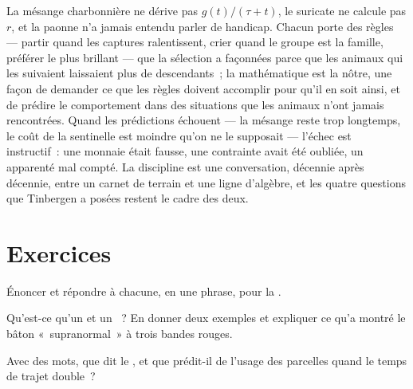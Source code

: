 \begin{remark}\label{rem:b3:behavioural-ecology:remark}
La mésange charbonnière ne dérive pas $g(t)/(\tau + t)$, le suricate ne
calcule pas $r$, et la paonne n'a jamais entendu parler de handicap.
Chacun porte des règles --- partir quand les captures ralentissent,
crier quand le groupe est la famille, préférer le plus brillant --- que
la sélection a façonnées parce que les animaux qui les suivaient
laissaient plus de descendants~; la mathématique est la nôtre, une façon
de demander ce que les règles doivent accomplir pour qu'il en soit
ainsi, et de prédire le comportement dans des situations que les animaux
n'ont jamais rencontrées. Quand les prédictions échouent --- la mésange
reste trop longtemps, le coût de la sentinelle est moindre qu'on ne le
supposait --- l'échec est instructif~: une monnaie était fausse, une
contrainte avait été oubliée, un apparenté mal compté. La discipline est
une conversation, décennie après décennie, entre un carnet de terrain et
une ligne d'algèbre, et les quatre questions que Tinbergen a posées
restent le cadre des deux.
\end{remark}

\section{Exercices}

\begin{exercise}[$\star$]\label{exo:b3:behavioural-ecology:1}
Énoncer  et répondre à chacune, en une
phrase, pour la .
\end{exercise}

\begin{exercise}[$\star$]\label{exo:b3:behavioural-ecology:2}
Qu'est-ce qu'un  et un ~? En
donner deux exemples et expliquer ce qu'a montré le bâton
«~supranormal~» à trois bandes rouges.
\end{exercise}

\begin{exercise}[$\star$]\label{exo:b3:behavioural-ecology:3}
Avec des mots, que dit le , et que
prédit-il de l'usage des parcelles quand le temps de trajet double~?
\end{exercise}

